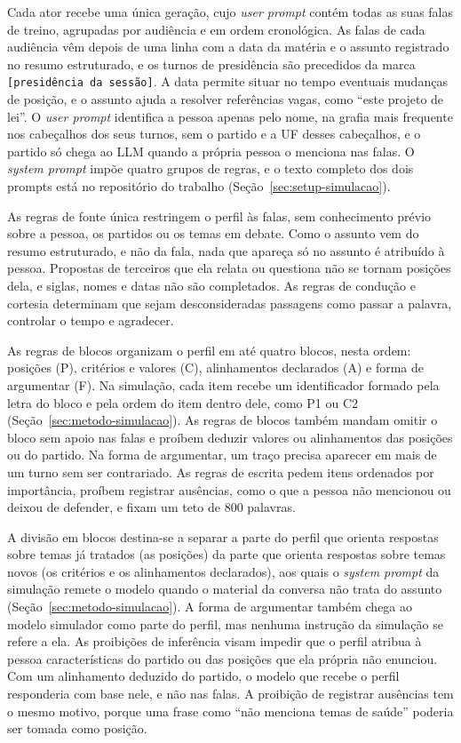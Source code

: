 Cada ator recebe uma única geração, cujo \textit{user prompt} contém todas as suas falas de treino,
agrupadas por audiência e em ordem cronológica. As falas de cada audiência vêm depois de uma linha
com a data da matéria e o assunto registrado no resumo estruturado, e os turnos de presidência são
precedidos da marca \texttt{[presidência da sessão]}. A data permite situar no tempo eventuais
mudanças de posição, e o assunto ajuda a resolver referências vagas, como ``este projeto de lei''. O
\textit{user prompt} identifica a pessoa apenas pelo nome, na grafia mais frequente nos cabeçalhos dos
seus turnos, sem o partido e a UF desses cabeçalhos, e o partido só chega ao LLM quando a própria pessoa o menciona nas falas. O
\textit{system prompt} impõe quatro grupos de regras, e o texto completo dos dois prompts está no
repositório do trabalho (Seção~\ref{sec:setup-simulacao}).

As regras de fonte única restringem o perfil às falas, sem conhecimento prévio sobre a pessoa, os
partidos ou os temas em debate. Como o assunto vem do resumo estruturado, e não da fala, nada que
apareça só no assunto é atribuído à pessoa. Propostas de terceiros que ela relata ou questiona não se
tornam posições dela, e siglas, nomes e datas não são completados. As regras de condução e cortesia
determinam que sejam desconsideradas passagens como passar a palavra, controlar o tempo e agradecer.

As regras de blocos organizam o perfil em até quatro blocos, nesta ordem: posições (P), critérios e
valores (C), alinhamentos declarados (A) e forma de argumentar (F). Na simulação, cada item recebe um
identificador formado pela letra do bloco e pela ordem do item dentro dele, como P1 ou C2
(Seção~\ref{sec:metodo-simulacao}). As regras de blocos também mandam omitir o bloco sem apoio nas
falas e proíbem deduzir valores ou alinhamentos das posições ou do partido. Na forma de argumentar,
um traço precisa aparecer em mais de um turno sem ser contrariado. As regras de escrita pedem itens ordenados por importância,
proíbem registrar ausências, como o que a pessoa não mencionou ou deixou de defender, e fixam um teto
de 800 palavras.

A divisão em blocos destina-se a separar a parte do perfil que orienta respostas sobre temas já
tratados (as posições) da parte que orienta respostas sobre temas novos (os critérios e os
alinhamentos declarados), aos quais o \textit{system prompt} da simulação remete o modelo quando o
material da conversa não trata do assunto (Seção~\ref{sec:metodo-simulacao}). A forma de argumentar
também chega ao modelo simulador como parte do perfil, mas nenhuma instrução da simulação se refere a
ela. As proibições de inferência visam impedir que o perfil atribua à pessoa características do partido ou das posições
que ela própria não enunciou. Com um alinhamento deduzido do partido, o modelo que recebe o perfil
responderia com base nele, e não nas falas. A proibição de registrar ausências tem o mesmo motivo,
porque uma frase como ``não menciona temas de saúde'' poderia ser tomada como posição.

